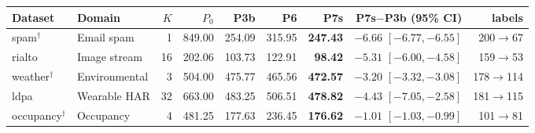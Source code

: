 \begin{tabular}{llrrrrrrr}
\toprule
Dataset & Domain & $K$ & $P_0$ & P3b & P6 & \textbf{P7s} & P7s$-$P3b (95\% CI) & labels \\
\midrule
spam$^{\dagger}$ & Email spam & 1 & 849.00 & 254.09 & 315.95 & \textbf{247.43} & $-6.66$ $[-6.77,-6.55]$ & 200$\to$67 \\
rialto & Image stream & 16 & 202.06 & 103.73 & 122.91 & \textbf{98.42} & $-5.31$ $[-6.00,-4.58]$ & 159$\to$53 \\
weather$^{\dagger}$ & Environmental & 3 & 504.00 & 475.77 & 465.56 & \textbf{472.57} & $-3.20$ $[-3.32,-3.08]$ & 178$\to$114 \\
ldpa & Wearable HAR & 32 & 663.00 & 483.25 & 506.51 & \textbf{478.82} & $-4.43$ $[-7.05,-2.58]$ & 181$\to$115 \\
occupancy$^{\dagger}$ & Occupancy & 4 & 481.25 & 177.63 & 236.45 & \textbf{176.62} & $-1.01$ $[-1.03,-0.99]$ & 101$\to$81 \\
\bottomrule
\end{tabular}
